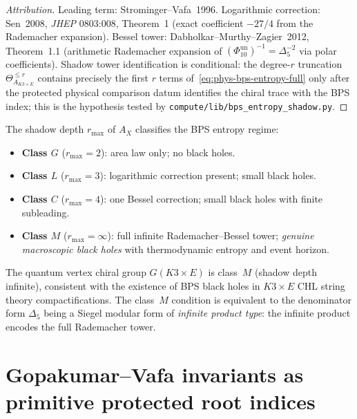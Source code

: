 \begin{proof}[Attribution]
Leading term: Strominger--Vafa~1996. Logarithmic correction: Sen~2008, \emph{JHEP} 0803:008, Theorem~1 (exact coefficient \(-27/4\) from the Rademacher expansion). Bessel tower: Dabholkar--Murthy--Zagier~2012, Theorem~1.1 (arithmetic Rademacher expansion of \((\Phi_{10}^{\mathrm{un}})^{-1}=\Delta_5^{-2}\) via polar coefficients). Shadow tower identification is conditional: the degree-\(r\) truncation \(\Theta^{\leq r}_{A_{K3\times E}}\) contains precisely the first \(r\) terms of~\eqref{eq:phys-bps-entropy-full} only after the protected physical comparison datum identifies the chiral trace with the BPS index; this is the hypothesis tested by \texttt{compute/lib/bps\_entropy\_shadow.py}.
\end{proof}

\begin{remark}
\label{rem:phys-shadow-depth-bh}
The shadow depth $r_{\max}$ of $A_X$ classifies the BPS entropy regime:
\begin{itemize}
\item \textbf{Class $G$} ($r_{\max} = 2$): area law only; no black holes.
\item \textbf{Class $L$} ($r_{\max} = 3$): logarithmic correction present; small black holes.
\item \textbf{Class $C$} ($r_{\max} = 4$): one Bessel correction; small black holes with finite subleading.
\item \textbf{Class $M$} ($r_{\max} = \infty$): full infinite Rademacher--Bessel tower; \emph{genuine macroscopic black holes} with thermodynamic entropy and event horizon.
\end{itemize}
The quantum vertex chiral group $G(K3 \times E)$ is class~$M$ (shadow depth infinite), consistent with the existence of BPS black holes in $K3 \times E$ CHL string theory compactifications. The class~$M$ condition is equivalent to the denominator form $\Delta_5$ being a Siegel modular form of \emph{infinite product type}: the infinite product encodes the full Rademacher tower.
\end{remark}

\section{Gopakumar--Vafa invariants as primitive protected root indices}
\label{sec:phys-gv-primitive}

